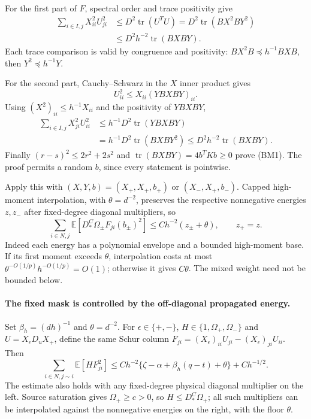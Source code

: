 \documentclass[10pt]{article}
\numberwithin{equation}{section}
\newcommand{\1}{\mathbf1}
\begin{document}
For the first part of $F$, spectral order and trace positivity give
\[
 \begin{split}
 \sum_{i\in I,j}X_{ii}^2U_{ji}^2
 &\le D^2\operatorname{tr}(U^TU)
   =D^2\operatorname{tr}(BX^2BY^2)\\
 &\le D^2h^{-2}\operatorname{tr}(BXBY).
 \end{split}                                               \tag{BM2}
\]
Each trace comparison is valid by congruence and positivity:
$BX^2B\preceq h^{-1}BXB$, then $Y^2\preceq h^{-1}Y$.

For the second part, Cauchy--Schwarz in the $X$ inner product gives
\[
 U_{ii}^2\le X_{ii}(YBXBY)_{ii}.
\]
Using $(X^2)_{ii}\le h^{-1}X_{ii}$ and the positivity of $YBXBY$,
\[
 \begin{split}
 \sum_{i\in I,j}X_{ji}^2U_{ii}^2
 &\le h^{-1}D^2\operatorname{tr}(YBXBY)\\
 &=h^{-1}D^2\operatorname{tr}(BXBY^2)
 \le D^2h^{-2}\operatorname{tr}(BXBY).
 \end{split}                                               \tag{BM3}
\]
Finally $(r-s)^2\le2r^2+2s^2$ and
$\operatorname{tr}(BXBY)=4b^TKb\ge0$ prove (BM1).
The proof permits a random $b$, since every statement is pointwise.

Apply this with $(X,Y,b)=(X_+,X_+,b_+)$ or
$(X_-,X_+,b_-)$. Capped high-moment interpolation, with
$\theta=d^{-2}$, preserves the respective nonnegative energies $z,z_-$
after fixed-degree diagonal multipliers, so
\[
 \sum_{i\in N,j}\mathbb E[D_*^C\Omega_\pm F_{ji}(b_\pm)^2]
                       \le Ch^{-2}(z_\pm+\theta),\qquad z_+=z.
 \tag{BM4}
\]
Indeed each energy has a polynomial envelope and a bounded high-moment
base. If its first moment exceeds $\theta$, interpolation costs at most
$\theta^{-O(1/p)}h^{-O(1/p)}=O(1)$; otherwise it gives $C\theta$.
The mixed weight need not be bounded below.

\paragraph{The fixed mask is controlled by the off-diagonal propagated energy.}
Set $\beta_h=(dh)^{-1}$ and $\theta=d^{-2}$.
For $\epsilon\in\{+,-\}$, $H\in\{1,\Omega_+,\Omega_-\}$ and
$U=X_\epsilon D_uX_+$, define the same Schur column
$F_{ji}=(X_\epsilon)_{ii}U_{ji}-(X_\epsilon)_{ji}U_{ii}$.
Then
\[
 \sum_{i\in N,j\sim i}\mathbb E[H F_{ji}^2]
 \le C h^{-2}\{\zeta-\alpha+\beta_h(q-t)+\theta\}
                         +C h^{-1/2}.
 \tag{FS1}
\]
The estimate also holds with any fixed-degree physical diagonal
multiplier on the left. Source saturation gives $\Omega_+\ge c>0$,
so $H\le D_*^C\Omega_+$; all such multipliers can be interpolated
against the nonnegative energies on the right, with the floor $\theta$.
\end{document}
